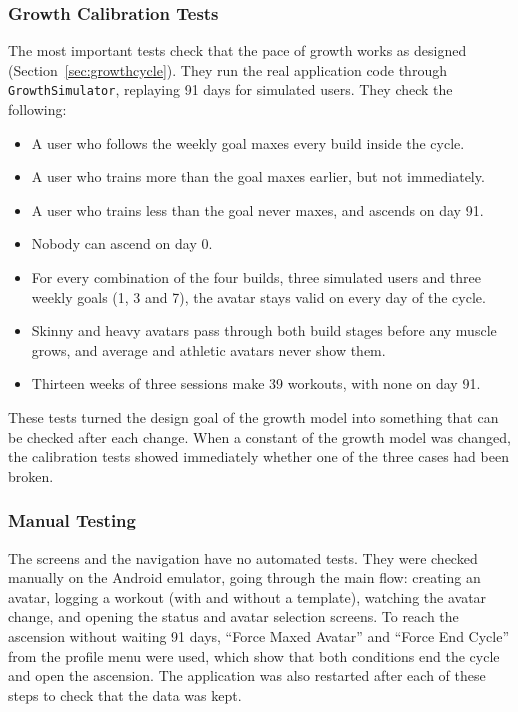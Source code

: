 \documentclass[11pt]{article}
\begin{document}
\subsubsection*{Growth Calibration Tests}

The most important tests check that the pace of growth works as designed (Section~\ref{sec:growthcycle}). They run the real application code through \texttt{GrowthSimulator}, replaying 91 days for simulated users. They check the following:
\begin{itemize}
  \item A user who follows the weekly goal maxes every build inside the cycle.
  \item A user who trains more than the goal maxes earlier, but not immediately.
  \item A user who trains less than the goal never maxes, and ascends on day 91.
  \item Nobody can ascend on day 0.
  \item For every combination of the four builds, three simulated users and three weekly goals (1, 3 and 7), the avatar stays valid on every day of the cycle.
  \item Skinny and heavy avatars pass through both build stages before any muscle grows, and average and athletic avatars never show them.
  \item Thirteen weeks of three sessions make 39 workouts, with none on day 91.
\end{itemize}

These tests turned the design goal of the growth model into something that can be checked after each change. When a constant of the growth model was changed, the calibration tests showed immediately whether one of the three cases had been broken.

\subsubsection*{Manual Testing}

The screens and the navigation have no automated tests. They were checked manually on the Android emulator, going through the main flow: creating an avatar, logging a workout (with and without a template), watching the avatar change, and opening the status and avatar selection screens. To reach the ascension without waiting 91 days, ``Force Maxed Avatar'' and ``Force End Cycle'' from the profile menu were used, which show that both conditions end the cycle and open the ascension. The application was also restarted after each of these steps to check that the data was kept.
\end{document}
